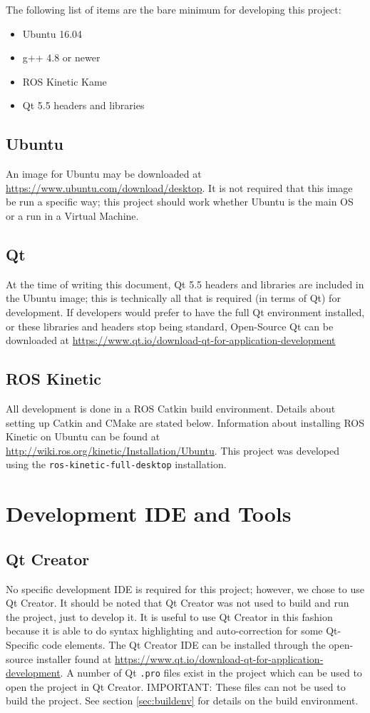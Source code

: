 The following list of items are the bare minimum for developing this project:
\begin{itemize}
	\item Ubuntu 16.04
	\item g++ 4.8 or newer
	\item ROS Kinetic Kame
	\item Qt 5.5 headers and libraries
\end{itemize}

\subsection{Ubuntu}
An image for Ubuntu may be downloaded at \url{https://www.ubuntu.com/download/desktop}. It is not required that this image be run a specific way; this project should work whether Ubuntu is the main OS or a run in a Virtual Machine.

\subsection{Qt}
At the time of writing this document, Qt 5.5 headers and libraries are included in the Ubuntu image; this is technically all that is required (in terms of Qt) for development. If developers would prefer to have the full Qt environment installed, or these libraries and headers stop being standard, Open-Source Qt can be downloaded at \url{https://www.qt.io/download-qt-for-application-development}

\subsection{ROS Kinetic}
All development is done in a ROS Catkin build environment. Details about setting up Catkin and CMake are stated below. Information about installing ROS Kinetic on Ubuntu can be found at \url{http://wiki.ros.org/kinetic/Installation/Ubuntu}. This project was developed using the \lstinline|ros-kinetic-full-desktop| installation.


\section{Development IDE and Tools}
\subsection{Qt Creator}
No specific development IDE is required for this project; however, we chose to use Qt Creator. It should be noted that Qt Creator was not used to build and run the project, just to develop it. It is useful to use Qt Creator in this fashion because it is able to do syntax highlighting and auto-correction for some Qt-Specific code elements. The Qt Creator IDE can be installed through the open-source installer found at \url{https://www.qt.io/download-qt-for-application-development}. A number of Qt \lstinline|.pro| files exist in the project which can be used to open the project in Qt Creator. IMPORTANT: These files can not be used to build the project. See section \ref{sec:buildenv} for details on the build environment.

